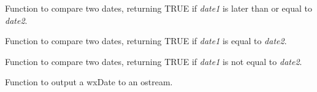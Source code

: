 Function to compare two dates, returning TRUE if {\it date1} is later than or equal to {\it date2}.

\label{wxdateequals}


Function to compare two dates, returning TRUE if {\it date1} is equal to {\it date2}.

\label{wxdatenotequals}


Function to compare two dates, returning TRUE if {\it date1} is not equal to {\it date2}.

\label{wxdateinsert}


Function to output a wxDate to an ostream.


